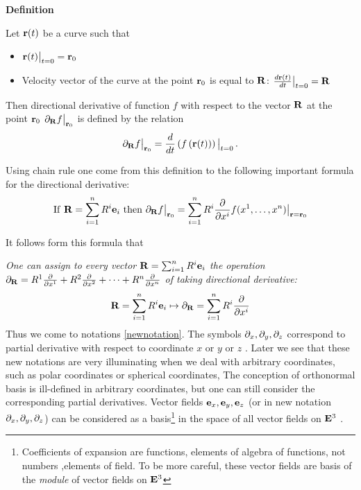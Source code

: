 \documentclass[12pt]{article}
\numberwithin{equation}{section}
\begin{document}
\m

{\bf Definition}

Let ${\bf r}(t)$ be a curve such that
           \begin{itemize}
   \item   ${\bf r}(t)\big\vert_{t=0}={\bf r}_0$

     \item Velocity vector of the curve at the point ${\bf r}_0$ is equal to ${\bf R}$:
               $
       {d{\bf r}(t)\over dt}\big\vert_{t=0}={\bf R}
              $
           \end{itemize}
  Then directional derivative of function $f$ with respect to the vector ${\bf R}$ at
  the point ${\bf r}_0$ $\partial_{\bf R} f\big\vert_{{\bf r}_0}$
  is defined by the relation
  \begin{equation}\label{dirderivative}
\partial_{\bf R} f\big\vert_{{\bf r}_0}={d\over dt}\left(f\left({\bf r}(t)\right)\right)\big\vert_{t=0}\,.
\end{equation}

\m

 Using chain rule one come from this definition to the following important formula for the directional derivative:
\begin{equation}\label{basicformulaforthisnotation}
    {\rm If}\,\, {\bf R}=\sum_{i=1}^n R^i{\bf e}_i\,\,{\rm  then}\,\,
\partial_{\bf R} f\big\vert_{{\bf r}_0}=\sum_{i=1}^n R^i{\partial\over \partial x^i}f(x^1,\dots,x^n)\big\vert_{{\bf r}={\bf r}_0}
\end{equation}

It follows form this formula that

{\it One can assign to every vector ${\bf R}=\sum_{i=1}^n R^i{\bf e}_i$ the operation
$\partial_{\bf R}=R^1{\partial\over \partial x^1}+R^2{\partial\over \partial x^2}+\dots+R^n{\partial\over \partial x^n}$ of taking directional derivative:}
\begin{equation}\label{assigning to vector derivative}
    {\bf R}=\sum_{i=1}^n R^i{\bf e}_i \mapsto \partial_{\bf R}=\sum_{i=1}^n R^i{\partial\over \partial x^i}
\end{equation}
Thus we come to notations \eqref{newnotation}. The symbols  $\partial_x,\partial_y, \partial_z$ correspond to partial derivative with respect to coordinate
  $x$ or $y$ or $z\,\,$. Later we see that these new notations are very illuminating when we deal
   with arbitrary coordinates, such as polar coordinates or spherical  coordinates,
    The conception of orthonormal basis
 is ill-defined in arbitrary coordinates, but one can still consider the corresponding partial derivatives.
Vector fields ${\bf e}_x,{\bf e}_y,{\bf e}_z$ (or in new notation $\partial_x,\partial_y,\partial_z$) can be considered as a
basis\footnote {
Coefficients of expansion are functions, elements of algebra of functions, not numbers ,elements of field.
To be more careful, these vector fields are basis of the {\it module} of vector
fields on ${\bf E}^3$} in the space
of all vector fields on ${\bf E}^3\,\,$.
\end{document}
